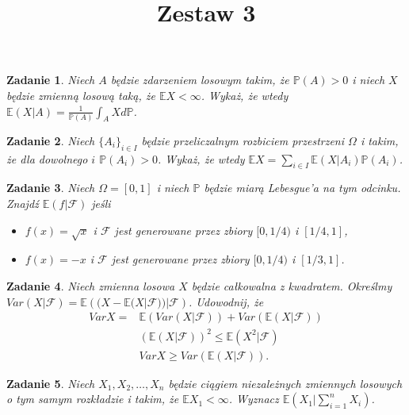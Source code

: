 \documentclass{mwart}
\title{Zestaw 3}
\newtheorem{zd}{Zadanie}
\begin{document}

\maketitle

\begin{zd}
Niech $A$ będzie zdarzeniem losowym takim, że $\mathbb{P}(A) > 0$ i niech $X$ będzie zmienną losową taką, że $\mathbb{E}X < \infty$. Wykaż, że wtedy $\mathbb{E}(X|A) = \frac{1}{\mathbb{P}(A)}\int_AXd\mathbb{P}$.
\end{zd}

\begin{zd}
Niech $\{A_i\}_{i \in I}$ będzie przeliczalnym rozbiciem przestrzeni $\Omega$ i takim, że dla dowolnego $i$ $\mathbb{P}(A_i) > 0$. Wykaż, że wtedy $\mathbb{E}X = \sum_{i\in I}\mathbb{E}(X|A_i)\mathbb{P}(A_i)$.
\end{zd}

\begin{zd}
Niech $\Omega = [0, 1]$ i niech $\mathbb{P}$ będzie miarą Lebesgue'a na tym odcinku. Znajdź $\mathbb{E}(f|\mathcal{F})$ jeśli
\begin{itemize}
\item $f(x) = \sqrt{x}$ i $\mathcal{F}$ jest generowane przez zbiory $[0, 1/4)$ i $[1/4, 1]$,
\item $f(x) = -x$ i $\mathcal{F}$ jest generowane przez zbiory $[0, 1/4)$ i $[1/3, 1]$.
\end{itemize}
\end{zd}

\begin{zd}
	Niech zmienna losowa $X$ będzie całkowalna z kwadratem. Określmy $Var (X|\mathcal{F}) = \mathbb{E}\left((X-\mathbb{E}(X|\mathcal{F}))|\mathcal{F}\right)$. Udowodnij, że
	\begin{displaymath}
	\begin{split}
	VarX = &\mathbb{E}\left(Var(X|\mathcal{F})\right) + Var\left(\mathbb{E}(X|\mathcal{F})\right)\\ &\left(\mathbb{E}(X|\mathcal{F})\right)^2 \leq \mathbb{E}(X^2|\mathcal{F})\\
	& VarX \geq Var\left(\mathbb{E}(X|\mathcal{F})\right).
	\end{split}
	\end{displaymath}
\end{zd}

\begin{zd}
Niech $X_1, X_2, \dots, X_n$ będzie ciągiem niezależnych zmiennych losowych o tym samym rozkładzie i takim, że $\mathbb{E}X_1 < \infty$. Wyznacz $\mathbb{E}(X_1|\sum_{i=1}^nX_i)$.
\end{zd}
\end{document}
